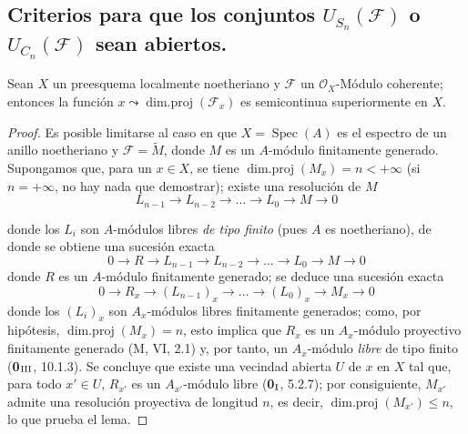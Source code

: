 \subsection{Criterios para que los conjuntos
$U_{S_n}(\mathcal F)$ o $U_{C_n}(\mathcal F)$ sean abiertos.}
\label{IV.2.s6.11-fr}

\begin{lemma}[6.11.1]
\label{IV.2.s6.11.1-fr}
Sean $X$ un preesquema localmente noetheriano y $\mathcal F$ un
$\mathcal O_X$-Módulo coherente; entonces la función
$x\leadsto\operatorname{dim.proj}(\mathcal F_x)$ es semicontinua
superiormente en $X$.
\end{lemma}

\begin{proof}
Es posible limitarse al caso en que $X=\operatorname{Spec}(A)$ es el espectro de un
anillo noetheriano y $\mathcal F=\widetilde M$, donde $M$ es un $A$-módulo
finitamente generado. Supongamos que, para un $x\in X$, se tiene
$\operatorname{dim.proj}(M_x)=n<+\infty$ (si $n=+\infty$, no hay nada que
demostrar); existe una resolución de $M$
\[
L_{n-1}\longrightarrow L_{n-2}\longrightarrow\ldots
\longrightarrow L_0\longrightarrow M\longrightarrow0
\]


donde los $L_i$ son $A$-módulos libres \emph{de tipo finito} (pues $A$ es
noetheriano), de donde se obtiene una sucesión exacta
\[
0\longrightarrow R\longrightarrow L_{n-1}\longrightarrow L_{n-2}
\longrightarrow\ldots\longrightarrow L_0\longrightarrow M
\longrightarrow0
\]
donde $R$ es un $A$-módulo finitamente generado; se deduce una sucesión exacta
\[
0\longrightarrow R_x\longrightarrow(L_{n-1})_x\longrightarrow\ldots
\longrightarrow(L_0)_x\longrightarrow M_x\longrightarrow0
\]
donde los $(L_i)_x$ son $A_x$-módulos libres finitamente generados; como, por
hipótesis, $\operatorname{dim.proj}(M_x)=n$, esto implica que $R_x$ es un
$A_x$-módulo proyectivo finitamente generado (M, VI, 2.1) y, por tanto, un
$A_x$-módulo \emph{libre} de tipo finito (\textbf{0}$_{\rm III}$, 10.1.3). Se concluye que
existe una vecindad abierta $U$ de $x$ en $X$ tal que, para todo
$x'\in U$, $R_{x'}$ es un $A_{x'}$-módulo libre (\textbf{0}$_{\rm I}$, 5.2.7);
por consiguiente, $M_{x'}$ admite una resolución proyectiva de longitud $n$, es decir,
$\operatorname{dim.proj}(M_{x'})\leq n$, lo que prueba el lema.
\end{proof}

